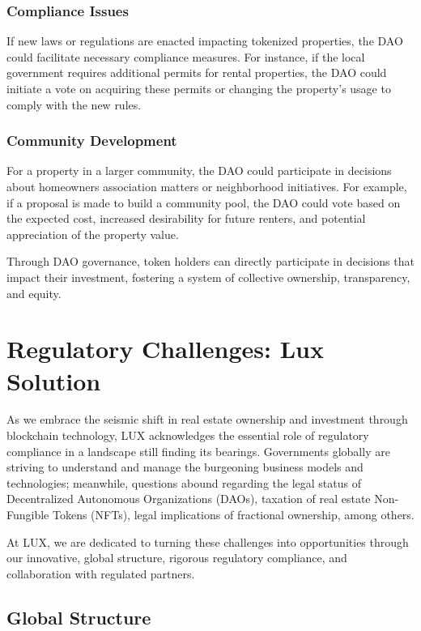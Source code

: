 \documentclass[11pt]{article}
\begin{document}
\subsubsection{Compliance Issues}

If new laws or regulations are enacted impacting tokenized properties, the DAO could facilitate necessary compliance measures. For instance, if the local government requires additional permits for rental properties, the DAO could initiate a vote on acquiring these permits or changing the property's usage to comply with the new rules.


\subsubsection{Community Development}

For a property in a larger community, the DAO could participate in decisions about homeowners association matters or neighborhood initiatives. For example, if a proposal is made to build a community pool, the DAO could vote based on the expected cost, increased desirability for future renters, and potential appreciation of the property value.


Through DAO governance, token holders can directly participate in decisions that impact their investment, fostering a system of collective ownership, transparency, and equity.


\section{Regulatory Challenges: Lux Solution}

As we embrace the seismic shift in real estate ownership and investment through blockchain technology, LUX acknowledges the essential role of regulatory compliance in a landscape still finding its bearings. Governments globally are striving to understand and manage the burgeoning business models and technologies; meanwhile, questions abound regarding the legal status of Decentralized Autonomous Organizations (DAOs), taxation of real estate Non-Fungible Tokens (NFTs), legal implications of fractional ownership, among others.


At LUX, we are dedicated to turning these challenges into opportunities through our innovative, global structure, rigorous regulatory compliance, and collaboration with regulated partners.


\subsection{Global Structure}
\end{document}
